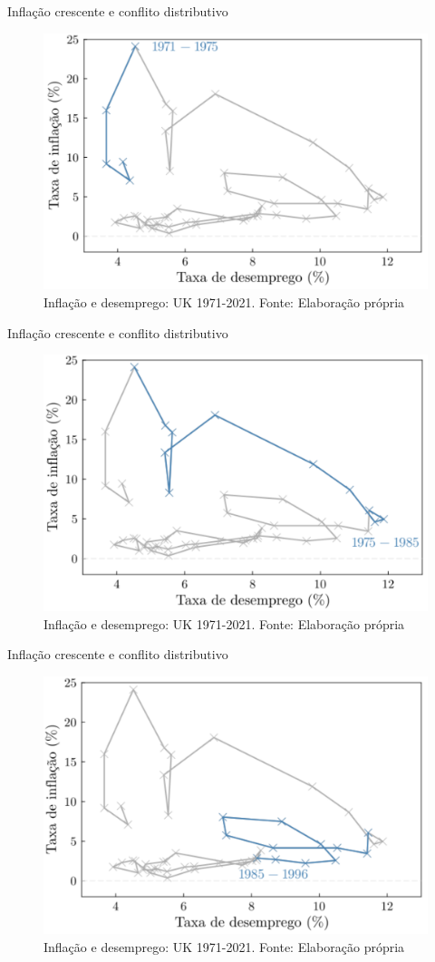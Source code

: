 \documentclass[10pt]{beamer}
\begin{document}
\begin{frame}
    {Inflação crescente e conflito distributivo}
    \begin{figure}
        \includegraphics[width=.65\textwidth]{./figures/aula15_fig12.PNG}
        \caption{Inflação e desemprego: UK 1971-2021. Fonte: Elaboração própria}
    \end{figure}
\end{frame}

\begin{frame}
    {Inflação crescente e conflito distributivo}
    \begin{figure}
        \includegraphics[width=.65\textwidth]{./figures/aula15_fig13.PNG}
        \caption{Inflação e desemprego: UK 1971-2021. Fonte: Elaboração própria}
    \end{figure}
\end{frame}

\begin{frame}
    {Inflação crescente e conflito distributivo}
    \begin{figure}
        \includegraphics[width=.65\textwidth]{./figures/aula15_fig14.PNG}
        \caption{Inflação e desemprego: UK 1971-2021. Fonte: Elaboração própria}
    \end{figure}
\end{frame}
\end{document}
